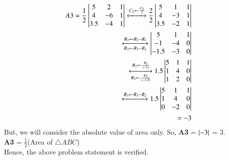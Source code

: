 \begin{equation}
\begin{aligned}
    A3 = \frac{1}{2}\begin{vmatrix}
      5       & 2    & 1 \\ 
      4       & -6    & 1 \\
      3.5       & -4     & 1 \\
      
    \end{vmatrix} \xleftrightarrow[]{C_2\leftarrow \frac{C_2}{2}} \frac{2}{2}\begin{vmatrix}
      5       &1    & 1 \\ 
      4       &-3    & 1 \\
      3.5       & -2    & 1 \\
      
    \end{vmatrix}\\
    \xleftrightarrow[R_3 \leftarrow R_3-R_1]{R_2\leftarrow R_2-R_1}
    \begin{vmatrix}
      5       & 1    & 1 \\ 
      -1       & -4    & 0 \\
      -1.5       & -3   & 0 \\
      
    \end{vmatrix} \\ \xleftrightarrow[R_3 \leftarrow \frac{R_3}{(-1.5)}]{R_2 \leftarrow \frac{R_2}{(-1)}}
    1.5 \begin{vmatrix}
      5       & 1    & 1 \\ 
      1       & 4    & 0 \\
      1       & 2   & 0 \\
      
    \end{vmatrix}\\ \xleftrightarrow[]{R_3\leftarrow R_3-R_2}
    1.5 \begin{vmatrix}
      5       & 1    & 1 \\ 
      1       & 4    & 0 \\
      0       & -2   & 0 \\
      
    \end{vmatrix}\\
    =-3
   \end{aligned}
  \end{equation}
But, we will consider the absolute value of area only. So, \textbf{A3} = $\left\vert-3\right\vert$ = 3.\\
 \textbf{A3} = $\frac{1}{2}$(Area of $\triangle ABC$)\\

Hence, the above problem statement is verified. 



